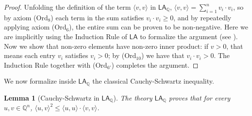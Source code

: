 \documentclass[11pt]{article}
\newcommand{\LA}{\mathsf{LA}}
\newcommand{\LAQ}{\mathsf{LA}_\mathbb{Q}}
\theoremstyle{definition}
\theoremstyle{plain}
\newtheorem{lemma}[definition]{Lemma}
\theoremstyle{remark}
\begin{document}
\begin{proof}
    Unfolding the definition of the term $\langle v, v \rangle$ in $\LAQ$, $\langle v, v \rangle = \sum_{i=1}^n v_i \cdot v_i$,
    so by axiom ($\text{Ord}_8$) each term in the sum satisfies $v_i \cdot v_i \geq 0$, and by repeatedly applying axiom ($\text{Ord}_6$), the entire sum can be proven to be non-negative. Here we are implicitly using the Induction Rule of $\LA$ to formalize the argument (see ). Now we show that non-zero elements have non-zero inner product: if $v > 0$, that means each entry $v_i$ satisfies $v_i > 0$; by ($\text{Ord}_{10}$) we have that $v_i \cdot v_i > 0$. The Induction Rule together with ($\text{Ord}_{6'}$) completes the argument.
\end{proof}

We now formalize inside $\LAQ$ the classical Cauchy-Schwartz inequality.

\begin{lemma}[Cauchy-Schwartz in $\LAQ$]
\label{lem:CS}
The theory $\LAQ$ proves that for every $u,v\in\mathbb{Q}^n$, $\langle u,v\rangle^2\leq\langle u,u\rangle\cdot\langle v,v\rangle$.
\end{lemma}
\end{document}
